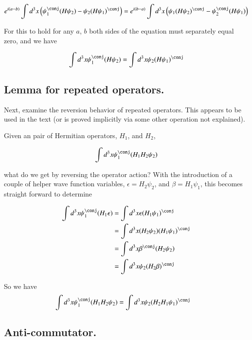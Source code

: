 \begin{align*}
e^{i(a-b)} \int d^3 x \left( \psi_1^\conj (H \psi_2) - \psi_2 (H \psi_1)^\conj \right) = e^{i(b-a)} \int d^3 x \left( \psi_1 (H \psi_2)^\conj - \psi_2^\conj (H \psi_1) \right)
\end{align*}

For this to hold for any $a$, $b$ both sides of the equation must separately equal zero, and we have

\begin{align}\label{eqn:commutator_herm:HermitianTwo}
\int d^3 x \psi_1^\conj (H \psi_2) = \int d^3 x \psi_2 (H \psi_1)^\conj
\end{align}

\subsection{Lemma for repeated operators. }

Next, examine the reversion behavior of repeated operators.  This appears to be used in the text (or is proved implicitly via some other operation not explained).

Given an pair of Hermitian operators, $H_1$, and $H_2$, 

\begin{align*}
\int d^3 x \psi_1^\conj (H_1 H_2 \psi_2)
\end{align*}

what do we get by reversing the operator action?  With the introduction of a couple of helper wave function variables, $\epsilon = H_2 \psi_2$, and $\beta = H_1 \psi_1$, 
this becomes straight forward to determine

\begin{align*}
\int d^3 x \psi_1^\conj (H_1 \epsilon)
&=
\int d^3 x \epsilon (H_1 \psi_1)^\conj \\
&=
\int d^3 x (H_2 \psi_2) (H_1 \psi_1)^\conj \\
&=
\int d^3 x \beta^\conj (H_2 \psi_2) \\
&=
\int d^3 x \psi_2 (H_2 \beta)^\conj \\
\end{align*}

So we have
\begin{align}\label{eqn:commutator_herm:reverse}
\int d^3 x \psi_1^\conj (H_1 H_2 \psi_2) &= \int d^3 x \psi_2 (H_2 H_1 \psi_1)^\conj 
\end{align}

\subsection{Anti-commutator. }

